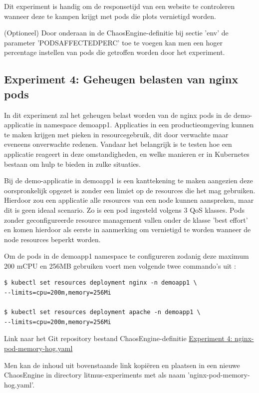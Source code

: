 Dit experiment is handig om de responsetijd van een website te controleren wanneer deze te kampen krijgt met pods die plots vernietigd worden. 

(Optioneel) Door onderaan in de ChaosEngine-definitie bij sectie 'env' de parameter 'PODS\textunderscore AFFECTED\textunderscore PERC' toe te voegen kan men een hoger percentage instellen van pods die getroffen worden door het experiment.

\subsection{Experiment 4: Geheugen belasten van nginx pods}

In dit experiment zal het geheugen belast worden van de nginx pods in de demo-applicatie in namespace demoapp1. Applicaties in een productieomgeving kunnen te maken krijgen met pieken in resourcegebruik, dit door verwachte maar eveneens onverwachte redenen. Vandaar het belangrijk is te testen hoe een applicatie reageert in deze omstandigheden, en welke manieren er in Kubernetes bestaan om hulp te bieden in zulke situaties. 

Bij de demo-applicatie in demoapp1 is een kanttekening te maken aangezien deze oorspronkelijk opgezet is zonder een limiet op de resources die het mag gebruiken. Hierdoor zou een applicatie alle resources van een node kunnen aanspreken, maar dit is geen ideaal scenario. Zo is een pod ingesteld volgens 3 QoS klasses. Pods zonder geconfigureerde resource management vallen onder de klasse 'best effort' en komen hierdoor als eerste in aanmerking om vernietigd te worden wanneer de node resources beperkt worden. \autocite{Tatiyana2020}

Om de pods in de demoapp1 namespace te configureren zodanig deze maximum 200 mCPU en 256MB gebruiken voert men volgende twee commando's uit \autocite{Kubernetes2022c}: 
\begin{lstlisting}
$ kubectl set resources deployment nginx -n demoapp1 \
--limits=cpu=200m,memory=256Mi

$ kubectl set resources deployment apache -n demoapp1 \
--limits=cpu=200m,memory=256Mi
\end{lstlisting}

Link naar het Git repository bestand ChaosEngine-definitie \href{https://github.com/KenBruggeman/BP_21-22/blob/master/bachelorproef/docs/litmus%20experimenten/nginx-pod-memory-hog.yaml}{Experiment 4: nginx-pod-memory-hog.yaml}

Men kan de inhoud uit bovenstaande link kopiëren en plaatsen in een nieuwe ChaosEngine in directory litmus-experiments met als naam 'nginx-pod-memory-hog.yaml'.

